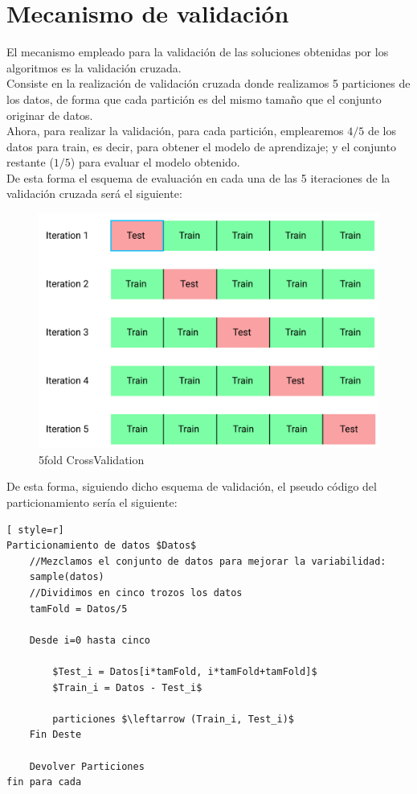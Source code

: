 \section{Mecanismo de validación}
El mecanismo empleado para la validación de las soluciones obtenidas por los algoritmos es la validación cruzada.\\ 

Consiste en la realización de validación cruzada donde realizamos 5 particiones de los datos, de forma que cada partición es del mismo tamaño que el conjunto originar de datos.\\ 
Ahora, para realizar la validación, para cada partición, emplearemos $4/5$ de los datos para train, es decir, para obtener el modelo de aprendizaje; y el conjunto restante ($1/5$) para evaluar el modelo obtenido.\\ 

De esta forma el esquema de evaluación en cada una de las 5 iteraciones de la validación cruzada será el siguiente:



\begin{figure}[H]
	\centering
	\includegraphics[scale=0.35]{CV.png}  
	\caption{5fold CrossValidation} \label{5fold CrossValidation}
\end{figure}

De esta forma, siguiendo dicho esquema de validación, el pseudo código del particionamiento sería el siguiente:

\begin{lstlisting}[ style=r]
Particionamiento de datos $Datos$
	//Mezclamos el conjunto de datos para mejorar la variabilidad:
	sample(datos)
	//Dividimos en cinco trozos los datos
	tamFold = Datos/5
	
	Desde i=0 hasta cinco
		
		$Test_i = Datos[i*tamFold, i*tamFold+tamFold]$
		$Train_i = Datos - Test_i$
		
		particiones $\leftarrow (Train_i, Test_i)$
	Fin Deste
	
	Devolver Particiones	
fin para cada
\end{lstlisting}


